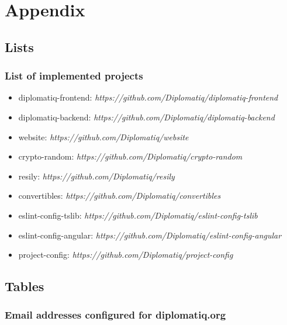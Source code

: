 \appendix
\chapter*{Appendix}
{}
\renewcommand{\thesection}{\Alph{section}}

\section{Lists}

\subsection{List of implemented projects}

\begin{itemize}
\item diplomatiq-frontend: \emph{https://github.com/Diplomatiq/diplomatiq-frontend}
\item diplomatiq-backend: \emph{https://github.com/Diplomatiq/diplomatiq-backend}
\item website: \emph{https://github.com/Diplomatiq/website}
\item crypto-random: \emph{https://github.com/Diplomatiq/crypto-random}
\item resily: \emph{https://github.com/Diplomatiq/resily}
\item convertibles: \emph{https://github.com/Diplomatiq/convertibles}
\item eslint-config-tslib: \emph{https://github.com/Diplomatiq/eslint-config-tslib}
\item eslint-config-angular: \emph{https://github.com/Diplomatiq/eslint-config-angular}
\item project-config: \emph{https://github.com/Diplomatiq/project-config}
\end{itemize}

\section{Tables}

\subsection{Email addresses configured for diplomatiq.org}

